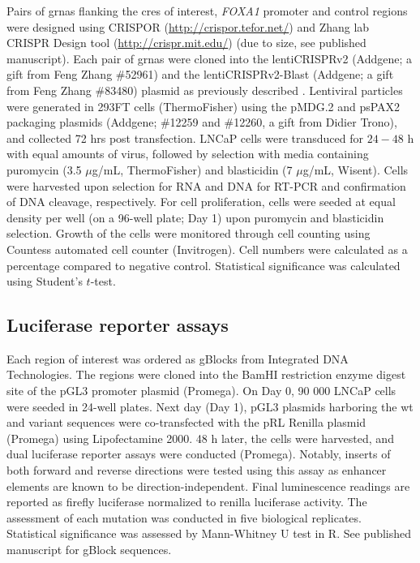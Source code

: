Pairs of \glspl{grna} flanking the \glspl{cre} of interest, \emph{FOXA1} promoter and control regions were designed using CRISPOR (\url{http://crispor.tefor.net/}) and Zhang lab CRISPR Design tool (\url{http://crispr.mit.edu/}) (due to size, see published manuscript).
Each pair of \glspl{grna} were cloned into the lentiCRISPRv2 (Addgene; a gift from Feng Zhang \#52961) and the lentiCRISPRv2-Blast (Addgene; a gift from Feng Zhang \#83480) plasmid as previously described \cite{sanjanaImprovedVectorsGenomewide2014}.
Lentiviral particles were generated in 293FT cells (ThermoFisher) using the pMDG.2 and psPAX2 packaging plasmids (Addgene; \#12259 and \#12260, a gift from Didier Trono), and collected 72 hrs post transfection.
LNCaP cells were transduced for $24-48$ h with equal amounts of virus, followed by selection with media containing puromycin (3.5 $\mu$g/mL, ThermoFisher) and blasticidin (7 $\mu$g/mL, Wisent).
Cells were harvested upon selection for RNA and DNA for RT-PCR and confirmation of DNA cleavage, respectively.
For cell proliferation, cells were seeded at equal density per well (on a 96-well plate; Day 1) upon puromycin and blasticidin selection.
Growth of the cells were monitored through cell counting using Countess automated cell counter (Invitrogen).
Cell numbers were calculated as a percentage compared to negative control.
Statistical significance was calculated using Student's $t$-test.

\subsection{Luciferase reporter assays}

Each region of interest was ordered as gBlocks from Integrated DNA Technologies.
The regions were cloned into the BamHI restriction enzyme digest site of the pGL3 promoter plasmid (Promega).
On Day 0, 90 000 LNCaP cells were seeded in 24-well plates.
Next day (Day 1), pGL3 plasmids harboring the \gls{wt} and variant sequences were co-transfected with the pRL Renilla plasmid (Promega) using Lipofectamine 2000.
48 h later, the cells were harvested, and dual luciferase reporter assays were conducted (Promega).
Notably, inserts of both forward and reverse directions were tested using this assay as enhancer elements are known to be direction-independent.
Final luminescence readings are reported as firefly luciferase normalized to renilla luciferase activity.
The assessment of each mutation was conducted in five biological replicates.
Statistical significance was assessed by Mann-Whitney U test in R.
See published manuscript for gBlock sequences.

